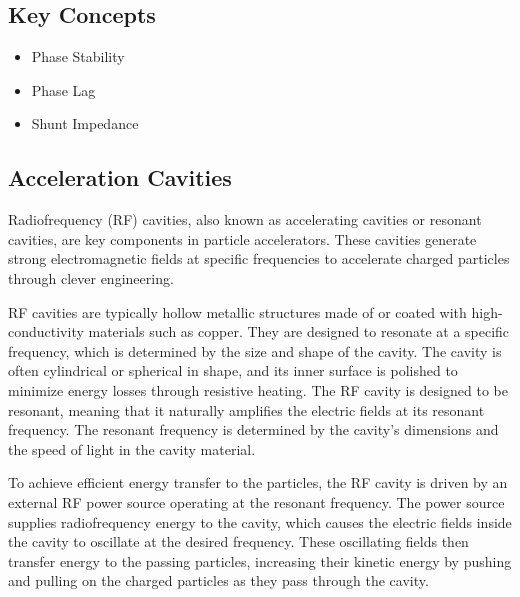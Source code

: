 \documentclass{article}
\begin{document}
\subsection{Key Concepts}

\begin{itemize}
    \item Phase Stability
    \item Phase Lag
    \item Shunt Impedance
    
\end{itemize}

\subsection{Acceleration Cavities} \label{sec:theory_cavities}
Radiofrequency (RF) cavities, also known as accelerating cavities or resonant cavities, are key components in particle accelerators. 
These cavities generate strong electromagnetic fields at specific frequencies to accelerate charged particles through clever engineering.

RF cavities are typically hollow metallic structures made of or coated with high-conductivity materials such as copper. 
They are designed to resonate at a specific frequency, which is determined by the size and shape of the cavity. 
The cavity is often cylindrical or spherical in shape, and its inner surface is polished to minimize energy losses through resistive heating.
The RF cavity is designed to be resonant, meaning that it naturally amplifies the electric fields at its resonant frequency. 
The resonant frequency is determined by the cavity's dimensions and the speed of light in the cavity material.

To achieve efficient energy transfer to the particles, the RF cavity is driven by an external RF power source operating at the resonant frequency. 
The power source supplies radiofrequency energy to the cavity, which causes the electric fields inside the cavity to oscillate at the desired frequency. 
These oscillating fields then transfer energy to the passing particles, increasing their kinetic energy by pushing and pulling on the charged particles as they pass through the cavity. 
\end{document}
